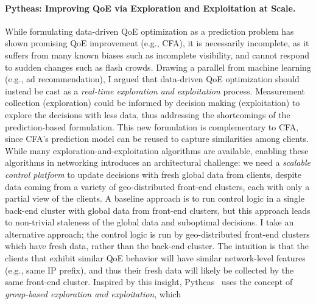 \paragraph{Pytheas: Improving QoE via Exploration and Exploitation at Scale.}
While formulating data-driven QoE optimization as a prediction problem has shown promising QoE improvement (e.g., CFA), 
it is necessarily incomplete, as 
it suffers from many known biases such as incomplete visibility, and cannot respond to sudden changes such as flash crowds.
Drawing a parallel from machine learning (e.g., ad recommendation), I argued that data-driven QoE optimization should instead be cast as a {\em real-time exploration and exploitation} process. %
Measurement collection (exploration) could be informed by decision making (exploitation) to explore the decisions with less data, thus addressing the shortcomings of the prediction-based formulation.
This new formulation is complementary to CFA, since CFA's prediction model can be reused to capture similarities among clients.
While many exploration-and-exploitation algorithms are available, enabling these algorithms in networking introduces an architectural challenge: we need a {\em scalable control platform} to update decisions with fresh global data from clients, despite data coming from a variety of geo-distributed front-end clusters, each with only a partial view of the clients.
A baseline approach is to run control logic in a single back-end cluster with global data from front-end clusters, but this approach leads to non-trivial staleness of the global data and suboptimal decisions.
I take an alternative approach; the control logic is run by geo-distributed front-end clusters which have fresh data, rather than the back-end cluster.
The intuition is that the clients that exhibit similar QoE behavior will have similar network-level features (e.g., same IP prefix), and thus their fresh data will likely be collected by the same front-end cluster.
Inspired by this insight, {Pytheas}~\cite{pytheas} uses the concept of {\em group-based exploration and exploitation}, which 
